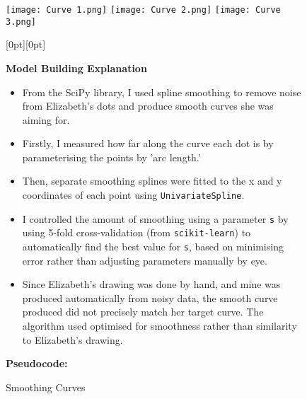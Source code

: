 \documentclass[12pt]{article}
\begin{document}
\begin{figure}[H]
\noindent %
\caption{Smoothing Curves}

\begin{minipage}[t]{0.48\textwidth}
    \texttt{[image: Curve 1.png]}
    \vspace{1em}
    \texttt{[image: Curve 2.png]}
    \vspace{1em}
    \texttt{[image: Curve 3.png]}
\end{minipage}%
\hspace{0.5em}
\begin{minipage}[t]{0.48\textwidth}
    \raisebox{3.5cm}[0pt][0pt]{%
    \begin{minipage}[t]{\textwidth}
        \begin{center}
            \textbf{Model Building Explanation}
        \end{center}
        \begin{itemize}
            \item From the SciPy library, I used spline smoothing to remove noise from Elizabeth's dots and produce smooth curves she was aiming for.
            \item Firstly, I measured how far along the curve each dot is by parameterising the points by 'arc length.'
            \item Then, separate smoothing splines were fitted to the x and y coordinates of each point using \texttt{UnivariateSpline}.
            \item I controlled the amount of smoothing using a parameter \texttt{s} by using 5-fold cross-validation (from \texttt{scikit-learn}) to automatically find the best value for \texttt{s}, based on minimising error rather than adjusting parameters manually by eye.
            \item Since Elizabeth's drawing was done by hand, and mine was produced automatically from noisy data, the smooth curve produced did not precisely match her target curve. The algorithm used optimised for smoothness rather than similarity to Elizabeth's drawing. 
        \end{itemize}
    \end{minipage}
    }
\end{minipage}

\vspace{1em}

\noindent
\textbf{Pseudocode:}


\end{figure}
\end{document}
